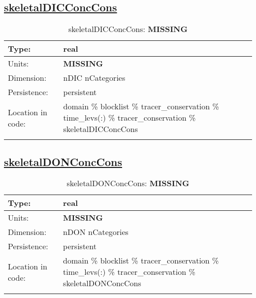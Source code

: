 \subsection[skeletalDICConcCons]{\hyperref[sec:var_tab_tracer_conservation]{skeletalDICConcCons}}
\label{subsec:var_sec_tracer_conservation_skeletalDICConcCons}
\begin{center}
\begin{longtable}{| p{2.0in} | p{4.0in} |}
        \hline 
        Type: & real \\
        \hline 
        Units: & {\bf \color{red} MISSING} \\
        \hline 
        Dimension: & nDIC nCategories \\
        \hline 
        Persistence: & persistent \\
        \hline 
         Location in code: & domain \% blocklist \% tracer\_conservation \% time\_levs(:) \% tracer\_conservation \% skeletalDICConcCons \\
         \hline 
    \caption{skeletalDICConcCons: {\bf \color{red} MISSING}}
\end{longtable}
\end{center}
\subsection[skeletalDONConcCons]{\hyperref[sec:var_tab_tracer_conservation]{skeletalDONConcCons}}
\label{subsec:var_sec_tracer_conservation_skeletalDONConcCons}
\begin{center}
\begin{longtable}{| p{2.0in} | p{4.0in} |}
        \hline 
        Type: & real \\
        \hline 
        Units: & {\bf \color{red} MISSING} \\
        \hline 
        Dimension: & nDON nCategories \\
        \hline 
        Persistence: & persistent \\
        \hline 
         Location in code: & domain \% blocklist \% tracer\_conservation \% time\_levs(:) \% tracer\_conservation \% skeletalDONConcCons \\
         \hline 
    \caption{skeletalDONConcCons: {\bf \color{red} MISSING}}
\end{longtable}
\end{center}
